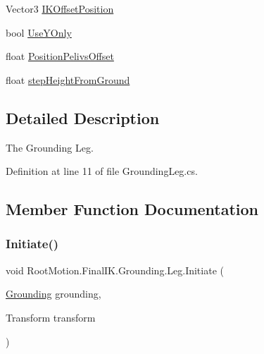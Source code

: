 \begin{DoxyCompactItemize}
Vector3 \mbox{\hyperlink{class_root_motion_1_1_final_i_k_1_1_grounding_1_1_leg_a56ced0aa0bcf61b5febf2f6e41decba1}{I\+K\+Offset\+Position}}
\item 
bool \mbox{\hyperlink{class_root_motion_1_1_final_i_k_1_1_grounding_1_1_leg_a6c1639491ee97bbbe1070350f8071c6f}{Use\+Y\+Only}}
\item 
float \mbox{\hyperlink{class_root_motion_1_1_final_i_k_1_1_grounding_1_1_leg_a84e6f4829c0fe417b16e4d47081b2256}{Position\+Pelivs\+Offset}}
\item 
float \mbox{\hyperlink{class_root_motion_1_1_final_i_k_1_1_grounding_1_1_leg_a3da7b4730d3058c858d2c909d5e5f455}{step\+Height\+From\+Ground}}
\end{DoxyCompactItemize}


\subsection{Detailed Description}
The Grounding Leg. 



Definition at line 11 of file Grounding\+Leg.\+cs.



\subsection{Member Function Documentation}
\mbox{\label{class_root_motion_1_1_final_i_k_1_1_grounding_1_1_leg_a1ea1d3afdd6c9e51affa834d3e9f2e16}} 
\subsubsection{\texorpdfstring{Initiate()}{Initiate()}}
{\footnotesize\ttfamily void Root\+Motion.\+Final\+I\+K.\+Grounding.\+Leg.\+Initiate (\begin{DoxyParamCaption}\item[{\mbox{\hyperlink{class_root_motion_1_1_final_i_k_1_1_grounding}{Grounding}}}]{grounding,  }\item[{Transform}]{transform }\end{DoxyParamCaption})}



